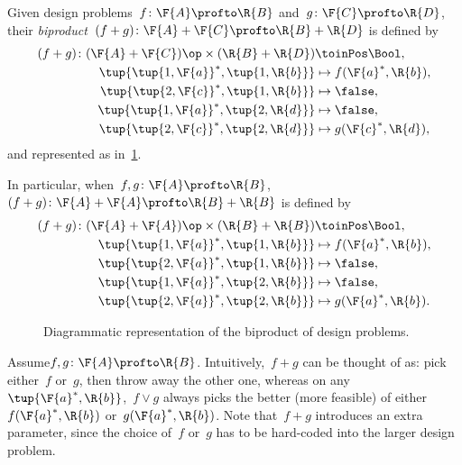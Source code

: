 \begin{definition}
  Given design problems~$f\colon \F{A} \profto \R{B}$ and~$g\colon \F{C} \profto \R{D}$, their \emph{biproduct}~$(f + g)\colon \F{A} + \F{C} \profto \R{B} + \R{D}$ is defined by
  \begin{equation}
    \begin{aligned}
      (f + g)\colon (\F{A} + \F{C})\op  \times (\R{B} + \R{D}) & \toinPos \Bool,  \\
      \tup{ \tup{1,\F{a}}^*, \tup{1,\R{b}}} & \mapsto f(\F{a}^*, \R{b}), \\
      \tup{ \tup{2,\F{c}}^*, \tup{1,\R{b}}} & \mapsto \false, \\
      \tup{ \tup{1,\F{a}}^*, \tup{2,\R{d}}} & \mapsto \false, \\
      \tup{ \tup{2,\F{c}}^*, \tup{2,\R{d}}} & \mapsto g(\F{c}^*, \R{d}),
    \end{aligned}
  \end{equation}
  and represented as in~\cref{fig:biproductdp}.

  In particular, when~$f, g\colon \F{A} \profto \R{B}$,~$(f + g)\colon \F{A} + \F{A} \profto \R{B} + \R{B}$ is defined by
  \begin{equation}
    \begin{aligned}
      (f + g) \colon (\F{A} + \F{A})\op  \times (\R{B} + \R{B}) & \toinPos \Bool,  \\
      \tup{ \tup{1, \F{a}}^*, \tup{1, \R{b}}} & \mapsto f(\F{a}^*, \R{b}), \\
      \tup{ \tup{2, \F{a}}^*, \tup{1, \R{b}}} & \mapsto \false, \\
      \tup{ \tup{1, \F{a}}^*, \tup{2, \R{b}}} & \mapsto \false, \\
      \tup{ \tup{2, \F{a}}^*, \tup{2, \R{b}}} & \mapsto g(\F{a}^*, \R{b}).
    \end{aligned}
  \end{equation}
\end{definition}

\begin{figure}[h!]
  \begin{center}
  \end{center}
  \caption{Diagrammatic representation of the biproduct of design problems. \label{fig:biproductdp}}
\end{figure}


Assume$f,g \colon \F{A} \profto \R{B}$. Intuitively,~$f+g$ can be thought of as: pick either~$f$ or~$g$, then throw away the other one, whereas on any~$\tup{\F{a}^*,\R{b}}$,~$f \vee g$ always picks the better (more feasible) of either~$f(\F{a}^*,\R{b})$ or~$g(\F{a}^*,\R{b})$. Note that~$f+g$ introduces an extra parameter, since the choice of~$f$ or~$g$ has to be hard-coded into the larger design problem.


